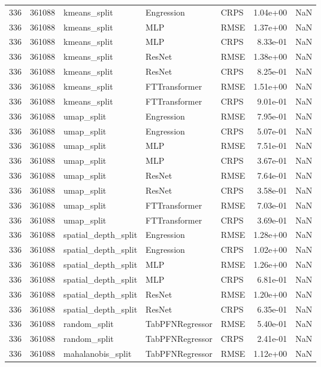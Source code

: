 \begin{tabular}{rrlllrr}
336 & 361088 & kmeans\_split & Engression & CRPS & 1.04e+00 & NaN \\
336 & 361088 & kmeans\_split & MLP & RMSE & 1.37e+00 & NaN \\
336 & 361088 & kmeans\_split & MLP & CRPS & 8.33e-01 & NaN \\
336 & 361088 & kmeans\_split & ResNet & RMSE & 1.38e+00 & NaN \\
336 & 361088 & kmeans\_split & ResNet & CRPS & 8.25e-01 & NaN \\
336 & 361088 & kmeans\_split & FTTransformer & RMSE & 1.51e+00 & NaN \\
336 & 361088 & kmeans\_split & FTTransformer & CRPS & 9.01e-01 & NaN \\
336 & 361088 & umap\_split & Engression & RMSE & 7.95e-01 & NaN \\
336 & 361088 & umap\_split & Engression & CRPS & 5.07e-01 & NaN \\
336 & 361088 & umap\_split & MLP & RMSE & 7.51e-01 & NaN \\
336 & 361088 & umap\_split & MLP & CRPS & 3.67e-01 & NaN \\
336 & 361088 & umap\_split & ResNet & RMSE & 7.64e-01 & NaN \\
336 & 361088 & umap\_split & ResNet & CRPS & 3.58e-01 & NaN \\
336 & 361088 & umap\_split & FTTransformer & RMSE & 7.03e-01 & NaN \\
336 & 361088 & umap\_split & FTTransformer & CRPS & 3.69e-01 & NaN \\
336 & 361088 & spatial\_depth\_split & Engression & RMSE & 1.28e+00 & NaN \\
336 & 361088 & spatial\_depth\_split & Engression & CRPS & 1.02e+00 & NaN \\
336 & 361088 & spatial\_depth\_split & MLP & RMSE & 1.26e+00 & NaN \\
336 & 361088 & spatial\_depth\_split & MLP & CRPS & 6.81e-01 & NaN \\
336 & 361088 & spatial\_depth\_split & ResNet & RMSE & 1.20e+00 & NaN \\
336 & 361088 & spatial\_depth\_split & ResNet & CRPS & 6.35e-01 & NaN \\
336 & 361088 & random\_split & TabPFNRegressor & RMSE & 5.40e-01 & NaN \\
336 & 361088 & random\_split & TabPFNRegressor & CRPS & 2.41e-01 & NaN \\
336 & 361088 & mahalanobis\_split & TabPFNRegressor & RMSE & 1.12e+00 & NaN \\

\end{tabular}
